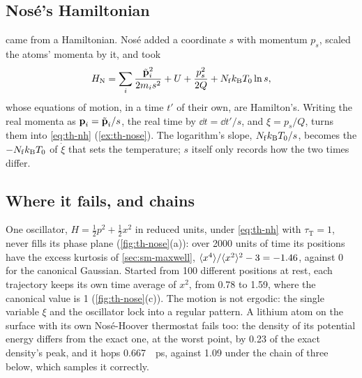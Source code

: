 \subsection*{Nosé's Hamiltonian}

 came from a Hamiltonian. Nosé added a coordinate $s$
with momentum $p_s$, scaled the atoms' momenta by it, and took
\begin{equation*}
   H_{\mathrm N} = \sum_i\frac{\tilde{\bm{\mathrm{p}}}_i^2}{2m_is^2} + U
   + \frac{p_s^2}{2Q} + N_{\mathrm f}k_{\mathrm{B}} T_0\ln s ,
\end{equation*}
whose equations of motion, in a time $t'$ of their own, are Hamilton's.
Writing the real momenta as $\bm{\mathrm{p}}_i = \tilde{\bm{\mathrm{p}}}_i/s$, the real
time by $\dd t = \dd t'/s$, and $\xi = p_s/Q$, turns them into
\cref{eq:th-nh} (\cref{ex:th-nose}). The logarithm's slope,
$N_{\mathrm f}k_{\mathrm{B}} T_0/s$, becomes the $-N_{\mathrm f}k_{\mathrm{B}} T_0$ of $\dot\xi$
that sets the temperature; $s$ itself only records how the two times
differ.

\subsection*{Where it fails, and chains}

One oscillator, $H = \frac12p^2 + \frac12x^2$ in reduced units, under
\cref{eq:th-nh} with $\tau_{\mathrm T} = 1$, never fills its phase plane
(\cref{fig:th-nose}(a)): over 2000 units of time its positions have the
excess kurtosis of \cref{sec:sm-maxwell}, $\langle x^4 \rangle/\langle x^2 \rangle^2 - 3 =
-1.46$, against 0 for the canonical Gaussian. Started from 100 different positions at rest, each trajectory
keeps its own time average of $x^2$, from 0.78 to 1.59, where the
canonical value is 1 (\cref{fig:th-nose}(c)). The motion is not ergodic:
the single variable $\xi$ and the oscillator lock into a regular pattern.
A lithium atom on the surface with its own Nosé-Hoover thermostat fails
too: the density of its potential energy differs from the exact one, at
the worst point, by 0.23 of the exact density's peak, and it hops
\SI{0.667}{\per\pico\second}, against 1.09 under the chain of three
below, which samples it correctly.

